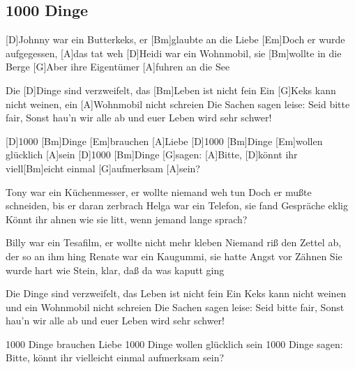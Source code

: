 \subsection*{1000 Dinge   }
\begin{guitar}

[D]Johnny war ein Butterkeks, er [Bm]glaubte an die Liebe
[Em]Doch er wurde aufgegessen, [A]das tat weh
[D]Heidi war ein Wohnmobil, sie [Bm]wollte in die Berge
[G]Aber ihre Eigentümer [A]fuhren an die See


Die [D]Dinge sind verzweifelt, das [Bm]Leben ist nicht fein
Ein [G]Keks kann nicht weinen, ein [A]Wohnmobil nicht schreien
Die Sachen sagen leise: Seid bitte fair,
Sonst hau'n wir alle ab und euer Leben wird sehr schwer!



[D]1000 [Bm]Dinge [Em]brauchen [A]Liebe
[D]1000 [Bm]Dinge [Em]wollen glücklich [A]sein
[D]1000 [Bm]Dinge [G]sagen: [A]Bitte,
[D]könnt ihr viell[Bm]eicht einmal [G]aufmerksam [A]sein?



Tony war ein Küchenmesser, er wollte niemand weh tun
Doch er mußte schneiden, bis er daran zerbrach
Helga war ein Telefon, sie fand Gespräche eklig
Könnt ihr ahnen wie sie litt, wenn jemand lange sprach?


Billy war ein Tesafilm, er wollte nicht mehr kleben
Niemand riß den Zettel ab, der so an ihm hing
Renate war ein Kaugummi, sie hatte Angst vor Zähnen
Sie wurde hart wie Stein, klar, daß da was kaputt ging


Die Dinge sind verzweifelt, das Leben ist nicht fein
Ein Keks kann nicht weinen und ein Wohnmobil nicht schreien
Die Sachen sagen leise: Seid bitte fair,
Sonst hau'n wir alle ab und euer Leben wird sehr schwer!


1000 Dinge brauchen Liebe
1000 Dinge wollen glücklich sein
1000 Dinge sagen: Bitte,
könnt ihr vielleicht einmal aufmerksam sein?

\end{guitar}
